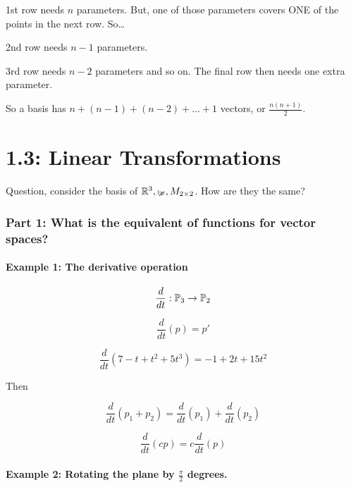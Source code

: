 \documentclass[a4paper]{article}
\begin{document}
1st row needs $n$ parameters. But, one of those parameters covers ONE of the points in the next row. So\ldots

2nd row needs $n - 1$ parameters. 

3rd row needs $n - 2$ parameters and so on. The final row then needs one extra parameter. 

So a basis has $n + (n - 1) + (n - 2) + \dots + 1$ vectors, or $\frac{n(n + 1)}{2}$.

\pagebreak
\part*{1.3: Linear Transformations}

Question, consider the basis of $\mathbb{R}^3, \mathbb{p_{3}}, M_{2 \times 2}$. How are they the same?

\section*{Part 1: What is the equivalent of functions for vector spaces?} 


\subsection*{Example 1: The derivative operation}

\[\frac{d}{dt}: \mathbb{P}_{3} \to \mathbb{P}_{2}\]

\[\frac{d}{dt}(p) = p'\]

\[\frac{d}{dt}(7 - t + t^2 + 5t^3) = -1 + 2t + 15t^2\]

Then 

\[\frac{d}{dt}(p_1 + p_2) = \frac{d}{dt}(p_1) + \frac{d}{dt}(p_2)\]

\[\frac{d}{dt}(cp) = c \frac{d}{dt}(p)\]

\subsection*{Example 2: Rotating the plane by $\frac{\pi}{2}$ degrees.}
\end{document}

